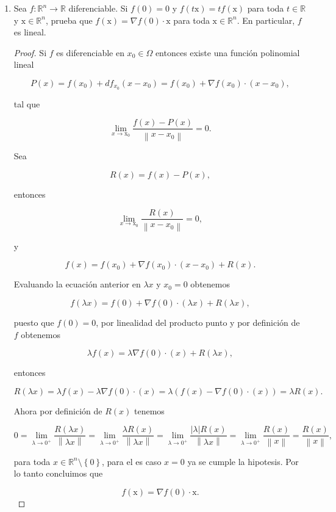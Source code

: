 \documentclass[letterpaper]{article}
\theoremstyle{definition}
\theoremstyle{lemathm}
\theoremstyle{lemathm}
\theoremstyle{lemademthm}
\newcommand{\pars}[1]{\left( #1 \right) }
\newcommand{\norm}[1]{\left\lVert#1\right\rVert}
\newcommand{\set}[1]{\left \{ #1 \right\} }
\newcommand{\R}{\mathbb{R}}
\newcommand{\1}{\mathbbm{1}}
\newcommand{\x}{\mathrm x}
\newcommand{\To}{\longrightarrow}
\begin{document}
\begin{enumerate}
\begin{proof}
		\end{proof}

		\item Sea $f:\R^n\To \R$ diferenciable. Si $f(0)=0$ y $f(t\x)=tf(\x)$ para toda $t\in \R$ y $\x\in \R^n$, prueba que $f(\x)=\nabla f(0)\cdot \x$ para toda $\x\in \R^n$. En particular, $f$ es lineal.
		
		\begin{proof}

			Si $f$ es diferenciable en $x_0\in\Omega$ entonces existe una función polinomial lineal

			\[P(x) = f(x_0) + df_{x_0}\pars{x-x_0} = f(x_0) + \nabla f(x_0)\cdot\pars{x-x_0},\]

			tal que

			\[\lim_{x\to\x_0} \frac{f(x)-P(x)}{\norm{x-x_0}} = 0.\]

			Sea

			\[R(x) = f(x) - P(x),\]

			entonces

			\[\lim_{x\to\x_0} \frac{R(x)}{\norm{x-x_0}} = 0,\]

			y

			\[f(x) = f(x_0) + \nabla f(x_0)\cdot\pars{x-x_0} + R(x).\]

			Evaluando la ecuación anterior en $\lambda x$ y $x_0 = 0$ obtenemos

			\[f(\lambda x) = f(0) + \nabla f(0)\cdot\pars{\lambda x} + R(\lambda x),\]

			puesto que $f(0) = 0$, por linealidad del producto punto y por definición de $f$ obtenemos

			\[\lambda f(x) = \lambda \nabla f(0)\cdot\pars{x} + R(\lambda x),\]

			entonces

			\[R(\lambda x) = \lambda f(x) - \lambda \nabla f(0)\cdot\pars{x} = \lambda \pars{f(x) - \nabla f(0)\cdot\pars{x}} = \lambda R(x).\]

			Ahora por definición de $R(x)$ tenemos

			\[0 = \lim_{\lambda \to 0^{+}} \frac{R(\lambda x)}{\norm{\lambda x}} = \lim_{\lambda \to 0^{+}} \frac{\lambda R(x)}{\norm{\lambda x}} = \lim_{\lambda \to 0^{+}} \frac{|\lambda|R(x)}{\norm{\lambda x}} = \lim_{\lambda \to 0^{+}} \frac{R(x)}{\norm{x}} = \frac{R(x)}{\norm{x}},\]

			para toda $x \in \R^n \setminus \set{0}$, para el es caso $x = 0$ ya se cumple la hipotesis. Por lo tanto concluimos que

			\[f(\x)=\nabla f(0)\cdot \x.\]


\end{proof}
\end{enumerate}
\end{document}
